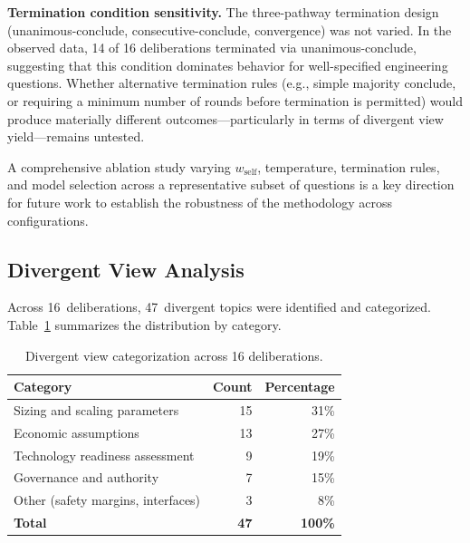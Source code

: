 \documentclass[11pt,a4paper]{article}
\begin{document}
\textbf{Termination condition sensitivity.} The three-pathway termination design (unanimous-conclude, consecutive-conclude, convergence) was not varied. In the observed data, 14 of 16 deliberations terminated via unanimous-conclude, suggesting that this condition dominates behavior for well-specified engineering questions. Whether alternative termination rules (e.g., simple majority conclude, or requiring a minimum number of rounds before termination is permitted) would produce materially different outcomes---particularly in terms of divergent view yield---remains untested.

A comprehensive ablation study varying $w_{\text{self}}$, temperature, termination rules, and model selection across a representative subset of questions is a key direction for future work to establish the robustness of the methodology across configurations.

\subsection{Divergent View Analysis}

Across 16~deliberations, 47~divergent topics were identified and categorized. Table~\ref{tab:divergent} summarizes the distribution by category.

\begin{table}[ht]
\centering
\caption{Divergent view categorization across 16 deliberations.}
\label{tab:divergent}
\begin{tabular}{@{}lrr@{}}
\toprule
\textbf{Category} & \textbf{Count} & \textbf{Percentage} \\
\midrule
Sizing and scaling parameters & 15 & 31\% \\
Economic assumptions & 13 & 27\% \\
Technology readiness assessment & 9 & 19\% \\
Governance and authority & 7 & 15\% \\
Other (safety margins, interfaces) & 3 & 8\% \\
\midrule
\textbf{Total} & \textbf{47} & \textbf{100\%} \\
\bottomrule
\end{tabular}
\end{table}
\end{document}
